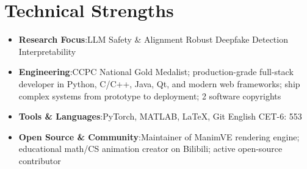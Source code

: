 \documentclass[a4paper,11pt]{article}
\newcommand{\resumeItem}[2]{
  \item{\textbf{#1}{:\hspace{0.5mm}#2 \vspace{-0.5mm}}}
}
\newcommand{\resumeSubItem}[2]{\resumeItem{#1}{#2}\vspace{-4pt}}
\newcommand{\resumeHeadingSkillStart}{\begin{itemize}[leftmargin=*,itemsep=1.7mm, rightmargin=2ex]}
\newcommand{\resumeHeadingSkillEnd}{\end{itemize}\vspace{-2mm}}
\begin{document}
\section{Technical Strengths}
\vspace{-0.4mm}
\resumeHeadingSkillStart
  \resumeSubItem{Research Focus}
    {LLM Safety \& Alignment \textbar{} Robust Deepfake Detection \textbar{} Interpretability}
  \resumeSubItem{Engineering}
    {CCPC National Gold Medalist; production-grade full-stack developer in Python, C/C++, Java, Qt, and modern web frameworks; ship complex systems from prototype to deployment; 2 software copyrights}
  \resumeSubItem{Tools \& Languages}
    {PyTorch, MATLAB, \LaTeX, Git \textbar{} English CET-6: 553}
  \resumeSubItem{Open Source \& Community}
    {Maintainer of ManimVE rendering engine; educational math/CS animation creator on Bilibili; active open-source contributor}
\resumeHeadingSkillEnd
\vspace{-4mm}

\end{document}
